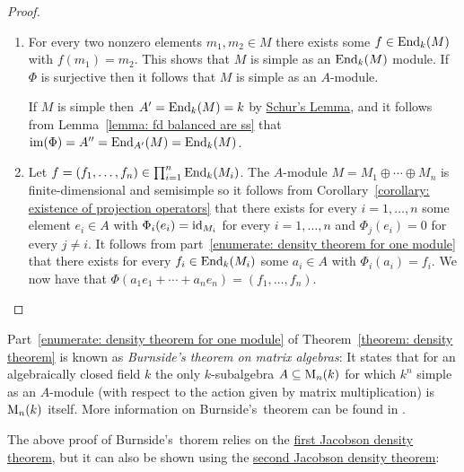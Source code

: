 \begin{proof}
  \leavevmode
  \begin{enumerate}
    \item
      For every two nonzero elements $m_1, m_2 \in M$ there exists some $f \in \operatorname{End}_k(M)$ with $f(m_1) = m_2$.
      This shows that $M$ is simple as an $\operatorname{End}_k(M)$ module.
      If $\Phi$ is surjective then it follows that $M$ is simple as an $A$-module.
      
      If $M$ is simple then $A' = \operatorname{End}_k(M) = k$ by \hyperref[proposition: schurs lemma for modules]{Schur’s Lemma}, and it follows from Lemma~\ref{lemma: fd balanced are ss} that $\operatorname{im}(\Phi) = A'' = \operatorname{End}_{A'}(M) = \operatorname{End}_k(M)$.
    \item
      Let $f = (f_1, \dotsc, f_n) \in \prod_{i=1}^n \operatorname{End}_k(M_i)$.
      The $A$-module $M = M_1 \oplus \dotsb \oplus M_n$ is finite-dimensional and semisimple so it follows from Corollary~\ref{corollary: existence of projection operators} that there exists for every $i = 1, \dotsc, n$ some element $e_i \in A$ with $\Phi_i(e_i) = \operatorname{id}_{M_i}$ for every $i = 1, \dotsc, n$ and $\Phi_j(e_i) = 0$ for every $j \neq i$.
      It follows from part~\ref*{enumerate: density theorem for one module} that there exists for every $f_i \in \operatorname{End}_k(M_i)$ some $a_i \in A$ with $\Phi_i(a_i) = f_i$.
      We now have that $\Phi(a_1 e_1 + \dotsb + a_n e_n) = (f_1, \dotsc, f_n)$.
    \qedhere
  \end{enumerate}
\end{proof}





\begin{remark}
  Part~\ref*{enumerate: density theorem for one module} of Theorem~\ref{theorem: density theorem} is known as \emph{Burnside’s theorem on matrix algebras}:
  It states that for an algebraically closed field $k$ the only $k$-subalgebra $A \subseteq \operatorname{M}_n(k)$ for which $k^n$ simple as an $A$-module (with respect to the action given by matrix multiplication) is $\operatorname{M}_n(k)$ itself.
  More information on Burnside’s~theorem can be found in \cite{ShapiroBurnside}.
  
  The above proof of Burnside’s~thorem  relies on the \hyperref[theorem: first jacobson density theorem]{first Jacobson density theorem}, but it can also be shown using the \hyperref[theorem: second jacobson density theorem]{second Jacobson density theorem}:
\end{remark}


